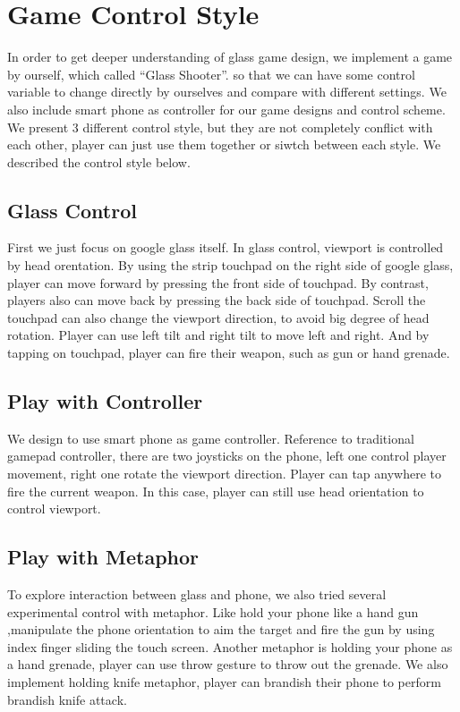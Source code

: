 \documentclass{sigchi}
\begin{document}
\section{Game Control Style}
In order to get deeper understanding of glass game design, we implement a game by ourself, which called ``Glass Shooter''. so that we can have some control variable to change directly by ourselves and compare with different settings. We also include smart phone as controller for our game designs and control scheme. We present 3 different control style, but they are not completely conflict with each other, player can just use them together or siwtch between each style. We described the control style below. 


\subsection{Glass Control}
First we just focus on google glass itself. In glass control, viewport is controlled by head orentation. By using the strip touchpad on the right side of google glass, player can move forward by pressing the front side of touchpad. By contrast, players also can move back by pressing the back side of touchpad. Scroll the touchpad can also change the viewport direction, to avoid big degree of head rotation. Player can use left tilt and right tilt to move left and right. And by tapping on touchpad, player can fire their weapon, such as gun or hand grenade. 

\subsection{Play with Controller}
We design to use smart phone as game controller. Reference to traditional gamepad controller, there are two joysticks on the phone, left one control player movement, right one rotate the viewport direction. Player can tap anywhere to fire the current weapon. In this case, player can still use head orientation to control viewport.

\subsection{Play with Metaphor}
To explore interaction between glass and phone, we also tried several experimental control with metaphor. Like hold your phone like a hand gun ,manipulate the phone orientation to aim the target and fire the gun by using index finger sliding the touch screen. Another metaphor is holding your phone as a hand grenade, player can use throw gesture to throw out the grenade. We also implement holding knife metaphor, player can brandish their phone to perform brandish knife attack.
\end{document}
